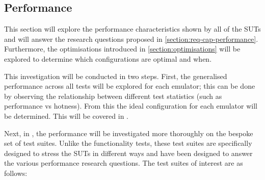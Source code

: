 \subsection{Performance}
\label{section:results-perf}

This section will explore the performance characteristics shown by all of the SUTs and will answer the research questions proposed in \autoref{section:req-cap-performance}. Furthermore, the optimisations introduced in \autoref{section:optimisations} will be explored to determine which configurations are optimal and when.

This investigation will be conducted in two steps. First, the generalised performance across all tests will be explored for each emulator; this can be done by observing the relationship between different test statistics (such as performance vs hotness). From this the ideal configuration for each emulator will be determined. This will be covered in .

Next, in , the performance will be investigated more thoroughly on the bespoke set of test suites. Unlike the functionality tests, these test suites are specifically designed to stress the SUTs in different ways and have been designed to answer the various performance research questions. The test suites of interest are as follows:

